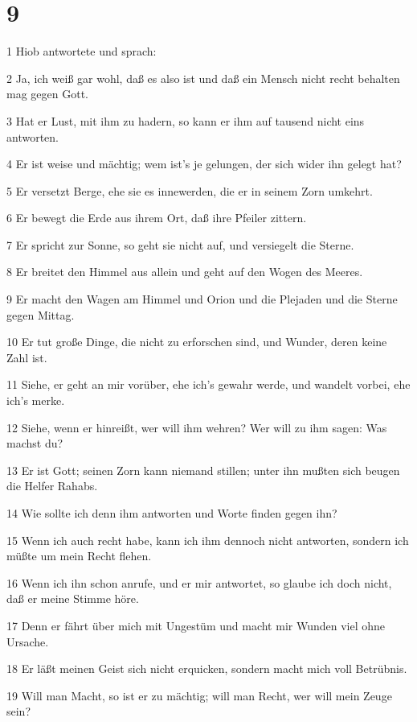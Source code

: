 \chapter{9}

\par 1 Hiob antwortete und sprach:
\par 2 Ja, ich weiß gar wohl, daß es also ist und daß ein Mensch nicht recht behalten mag gegen Gott.
\par 3 Hat er Lust, mit ihm zu hadern, so kann er ihm auf tausend nicht eins antworten.
\par 4 Er ist weise und mächtig; wem ist's je gelungen, der sich wider ihn gelegt hat?
\par 5 Er versetzt Berge, ehe sie es innewerden, die er in seinem Zorn umkehrt.
\par 6 Er bewegt die Erde aus ihrem Ort, daß ihre Pfeiler zittern.
\par 7 Er spricht zur Sonne, so geht sie nicht auf, und versiegelt die Sterne.
\par 8 Er breitet den Himmel aus allein und geht auf den Wogen des Meeres.
\par 9 Er macht den Wagen am Himmel und Orion und die Plejaden und die Sterne gegen Mittag.
\par 10 Er tut große Dinge, die nicht zu erforschen sind, und Wunder, deren keine Zahl ist.
\par 11 Siehe, er geht an mir vorüber, ehe ich's gewahr werde, und wandelt vorbei, ehe ich's merke.
\par 12 Siehe, wenn er hinreißt, wer will ihm wehren? Wer will zu ihm sagen: Was machst du?
\par 13 Er ist Gott; seinen Zorn kann niemand stillen; unter ihn mußten sich beugen die Helfer Rahabs.
\par 14 Wie sollte ich denn ihm antworten und Worte finden gegen ihn?
\par 15 Wenn ich auch recht habe, kann ich ihm dennoch nicht antworten, sondern ich müßte um mein Recht flehen.
\par 16 Wenn ich ihn schon anrufe, und er mir antwortet, so glaube ich doch nicht, daß er meine Stimme höre.
\par 17 Denn er fährt über mich mit Ungestüm und macht mir Wunden viel ohne Ursache.
\par 18 Er läßt meinen Geist sich nicht erquicken, sondern macht mich voll Betrübnis.
\par 19 Will man Macht, so ist er zu mächtig; will man Recht, wer will mein Zeuge sein?
